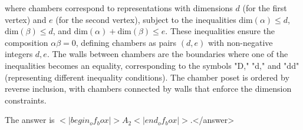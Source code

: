 where chambers correspond to representations with dimensions \(d\) (for the first vertex) and \(e\) (for the second vertex), subject to the inequalities \(\text{dim}(\alpha) \leq d\), \(\text{dim}(\beta) \leq d\), and \(\text{dim}(\alpha) + \text{dim}(\beta) \leq e\). These inequalities ensure the composition \(\alpha \beta = 0\), defining chambers as pairs \((d, e)\) with non-negative integers \(d, e\). The walls between chambers are the boundaries where one of the inequalities becomes an equality, corresponding to the symbols "D," "d," and "dd" (representing different inequality conditions). The chamber poset is ordered by reverse inclusion, with chambers connected by walls that enforce the dimension constraints.  

The answer is \(<|begin_of_box|>A_2<|end_of_box|>\).</answer>
